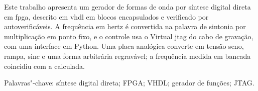 Este trabalho apresenta um gerador de formas de onda por síntese digital direta em \acs{fpga}, descrito em \acs{vhdl} em blocos encapsulados e verificado por  autoverificáveis. A frequência em hertz é convertida na palavra de sintonia por multiplicação em ponto fixo, e o controle usa o Virtual \acs{jtag} do cabo de gravação, com uma interface em Python. Uma placa analógica converte em tensão seno, rampa, sinc e uma forma arbitrária regravável; a frequência medida em bancada coincidiu com a calculada.

\vspace{\onelineskip}
\noindent Palavras"-chave: síntese digital direta; FPGA; VHDL; gerador de funções; JTAG.
